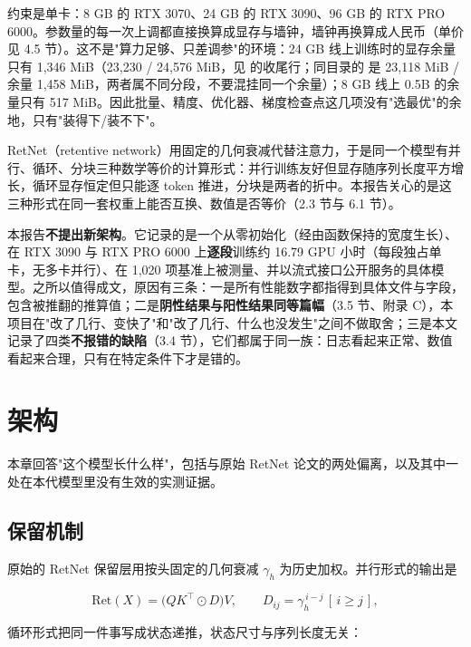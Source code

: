 \documentclass[11pt,openany]{ctexart}
\begin{document}
约束是单卡：8 GB 的 RTX 3070、24 GB 的 RTX 3090、96 GB 的 RTX PRO 6000。参数量的每一次上调都直接换算成显存与墙钟，墙钟再换算成人民币（单价见 4.5 节）。这不是"算力足够、只差调参"的环境：24 GB 线上训练时的显存余量只有 1,346 MiB（23,230 / 24,576 MiB，见  的收尾行；同目录的  是 23,118 MiB / 余量 1,458 MiB，两者属不同分段，不要混挂同一个余量）；8 GB 线上 0.5B 的余量只有 517 MiB。因此批量、精度、优化器、梯度检查点这几项没有"选最优"的余地，只有"装得下/装不下"。

RetNet（retentive network）用固定的几何衰减代替注意力，于是同一个模型有并行、循环、分块三种数学等价的计算形式：并行训练友好但显存随序列长度平方增长，循环显存恒定但只能逐 token 推进，分块是两者的折中。本报告关心的是这三种形式在同一套权重上能否互换、数值是否等价（2.3 节与 6.1 节）。

本报告\textbf{不提出新架构}。它记录的是一个从零初始化（经由函数保持的宽度生长）、在 RTX 3090 与 RTX PRO 6000 上\textbf{逐段}训练约 16.79 GPU 小时（每段独占单卡，无多卡并行）、在 1,020 项基准上被测量、并以流式接口公开服务的具体模型。之所以值得成文，原因有三条：一是所有性能数字都指得到具体文件与字段，包含被推翻的推算值；二是\textbf{阴性结果与阳性结果同等篇幅}（3.5 节、附录 C），本项目在"改了几行、变快了"和"改了几行、什么也没发生"之间不做取舍；三是本文记录了四类\textbf{不报错的缺陷}（3.4 节），它们都属于同一族：日志看起来正常、数值看起来合理，只有在特定条件下才是错的。

\section{架构}

本章回答"这个模型长什么样"，包括与原始 RetNet 论文的两处偏离，以及其中一处在本代模型里没有生效的实测证据。

\subsection{保留机制}

原始的 RetNet 保留层用按头固定的几何衰减 $\gamma_h$ 为历史加权。并行形式的输出是

\[
\mathrm{Ret}(X)=\big(QK^{\top}\odot D\big)V,\qquad D_{ij}=\gamma_h^{\,i-j}\,[\,i\ge j\,],
\]

循环形式把同一件事写成状态递推，状态尺寸与序列长度无关：
\end{document}
